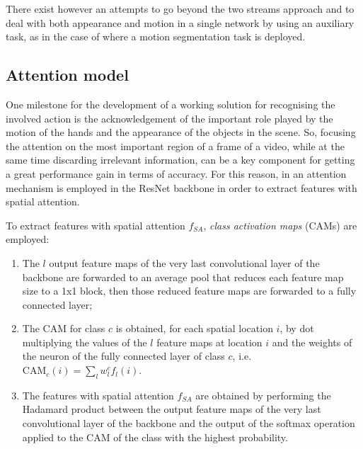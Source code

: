 \documentclass[10pt,twocolumn,letterpaper]{article}
\begin{document}
There exist however an attempts to go beyond the two streams approach and to deal with both appearance and motion in a single network by using an auxiliary task, as in the case of \cite{planamente2020joint} where a motion segmentation task is deployed.

\subsection{Attention model}
\label{par:AttentionModel}
One milestone for the development of a working solution for recognising the involved action is the acknowledgement of the important role played by the motion of the hands and the appearance of the objects in the scene. So, focusing the attention on the most important region of a frame of a video, while at the same time discarding irrelevant information, can be a key component for getting a great performance gain in terms of accuracy. For this reason, in \cite{Ego-RNN} an attention mechanism is employed in the ResNet backbone in order to extract features with spatial attention.

To extract features with spatial attention $f_{SA}$, \textit{class activation maps} (CAMs) are employed:
\begin{enumerate}
	\item The $l$ output feature maps of the very last convolutional layer of the backbone are forwarded to an average pool that reduces each feature map size to a 1x1 block, then those reduced feature maps are forwarded to a fully connected layer;
	\item The CAM for class $c$ is obtained, for each spatial location $i$, by dot multiplying the values of the $l$ feature maps at location $i$ and the weights of the neuron of the fully connected layer of class $c$, i.e. ${\text{CAM}_c(i) = \sum_l w_l^c f_l(i)}$. 
	\item The features with spatial attention $f_{SA}$ are obtained by performing the Hadamard product between the output feature maps of the very last convolutional layer of the backbone and the output of the softmax operation applied to the CAM of the class with the highest probability.
\end{enumerate}
\end{document}

